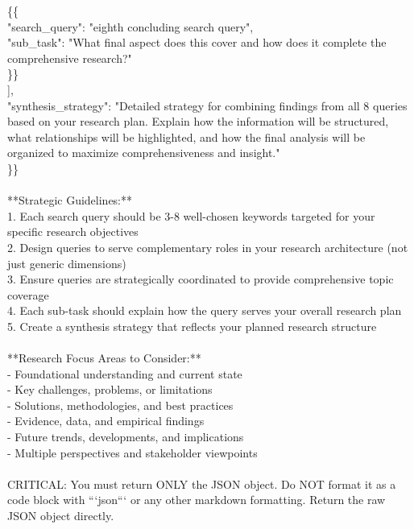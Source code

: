 \documentclass{article} %
\newcommand{\tab}{\hspace*{2em}}
\begin{document}
\begin{examplebox}
\tab \tab
\{\{ \\
\tab \tab \tab "search\_query": "eighth concluding search query",\\
\tab \tab \tab "sub\_task": "What final aspect does this cover and how does it complete the comprehensive research?"\\
\tab \tab \}\} \\
\tab ], \\
\tab "synthesis\_strategy": "Detailed strategy for combining findings from all 8 queries based on your research plan. Explain how the information will be structured, what relationships will be highlighted, and how the final analysis will be organized to maximize comprehensiveness and insight." \\
\}\} \\
\\
**Strategic Guidelines:**\\
1. Each search query should be 3-8 well-chosen keywords targeted for your specific research objectives\\
2. Design queries to serve complementary roles in your research architecture (not just generic dimensions)\\
3. Ensure queries are strategically coordinated to provide comprehensive topic coverage\\
4. Each sub-task should explain how the query serves your overall research plan\\
5. Create a synthesis strategy that reflects your planned research structure\\ \\
**Research Focus Areas to Consider:**\\
- Foundational understanding and current state\\
- Key challenges, problems, or limitations\\
- Solutions, methodologies, and best practices\\
- Evidence, data, and empirical findings\\
- Future trends, developments, and implications\\
- Multiple perspectives and stakeholder viewpoints\\
\\
CRITICAL: You must return ONLY the JSON object. Do NOT format it as a code block with ```json``` or any other markdown formatting. Return the raw JSON object directly. \end{examplebox}
\end{document}
